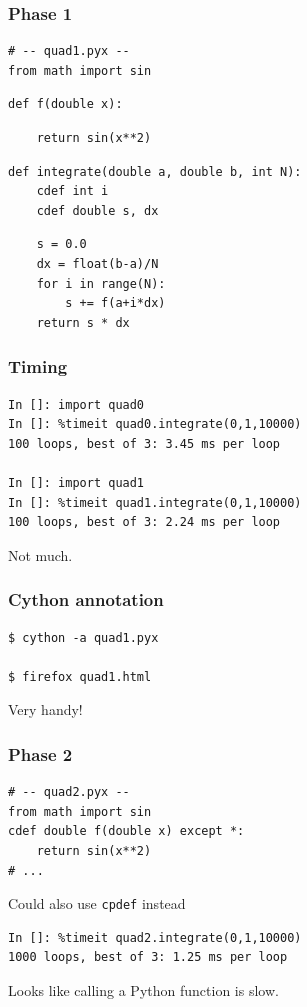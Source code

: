 \documentclass[14pt,compress]{beamer}
\newcounter{time}
\newcommand{\typ}[1]{\lstinline{#1}}
\begin{document}
\begin{frame}[fragile]
    \frametitle{Phase 1}
    \vspace*{-0.2in}
\begin{lstlisting}
# -- quad1.pyx --
from math import sin
\end{lstlisting}
\begin{lstlisting}
def f(double x):
\end{lstlisting}
\vspace*{-1ex}
\begin{lstlisting}
    return sin(x**2)
\end{lstlisting}
\begin{lstlisting}
def integrate(double a, double b, int N):
    cdef int i
    cdef double s, dx
\end{lstlisting}
\vspace*{-1ex}
\begin{lstlisting}
    s = 0.0
    dx = float(b-a)/N
    for i in range(N):
        s += f(a+i*dx)
    return s * dx
\end{lstlisting}

\end{frame}

\begin{frame}[fragile]
    \frametitle{Timing}
\begin{lstlisting}
In []: import quad0
In []: %timeit quad0.integrate(0,1,10000)
100 loops, best of 3: 3.45 ms per loop

In []: import quad1
In []: %timeit quad1.integrate(0,1,10000)
100 loops, best of 3: 2.24 ms per loop
\end{lstlisting}
Not much.
\end{frame}

\begin{frame}[fragile]
    \frametitle{Cython annotation}
\begin{lstlisting}
$ cython -a quad1.pyx

$ firefox quad1.html
\end{lstlisting}
Very handy!

\end{frame}


\begin{frame}[fragile]
    \frametitle{Phase 2}
\begin{lstlisting}
# -- quad2.pyx --
from math import sin
cdef double f(double x) except *:
    return sin(x**2)
# ...
\end{lstlisting}
Could also use \typ{cpdef} instead

\begin{lstlisting}
In []: %timeit quad2.integrate(0,1,10000)
1000 loops, best of 3: 1.25 ms per loop
\end{lstlisting}
Looks like calling a Python function is slow.

\end{frame}
\end{document}
